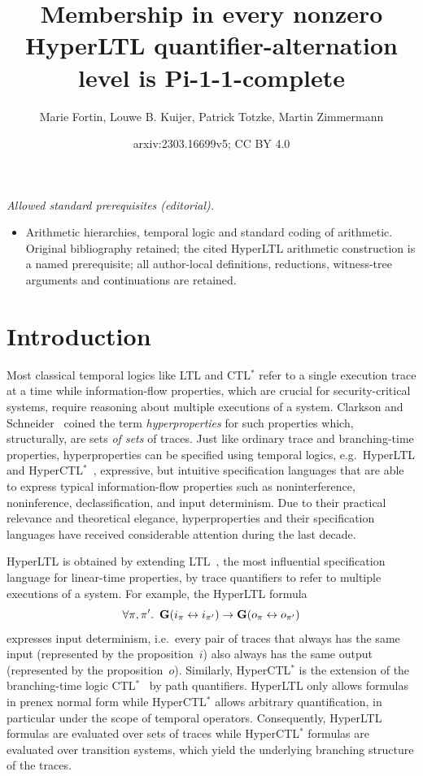 \documentclass[dvipsnames,10pt,a4paper]{amsart}
\title{Membership in every nonzero HyperLTL quantifier-alternation level is Pi-1-1-complete}
\author{Marie Fortin, Louwe B. Kuijer, Patrick Totzke, Martin Zimmermann}
\date{arxiv:2303.16699v5; CC BY 4.0}
\theoremstyle{definition}
\theoremstyle{remark}
\newcommand{\G}{\mathop{\mathbf{G}\vphantom{a}}\nolimits}
\newcommand{\ltl}{{LTL}\xspace}
\newcommand{\ctlstar}{{CTL$^*$}\xspace}
\newcommand{\hyltl}{{HyperLTL}\xspace}
\newcommand{\hyctlstar}{{HyperCTL$^*$}\xspace}
\begin{document}
\maketitle
\noindent\textit{Allowed standard prerequisites (editorial).}\begin{itemize}
\item Arithmetic hierarchies, temporal logic and standard coding of arithmetic. Original bibliography retained; the cited HyperLTL arithmetic construction is a named prerequisite; all author-local definitions, reductions, witness-tree arguments and continuations are retained.
\end{itemize}\medskip
\section{Introduction}
\label{sec:intro}

Most classical temporal logics like \ltl and \ctlstar refer to a single execution trace at a time while information-flow properties, which are crucial for security-critical systems,
require reasoning about multiple executions of a system. 
Clarkson and Schneider~\cite{ClarksonS10} coined the term \emph{hyperproperties} for such properties which, structurally, are sets \emph{of sets} of traces.
Just like ordinary trace and branching-time properties, hyperproperties can be specified using temporal logics, e.g.\ \hyltl and \hyctlstar~\cite{ClarksonFKMRS14}, expressive, but intuitive specification languages that are able to express typical information-flow properties such as noninterference, noninference, declassification, and input determinism.
Due to their practical relevance and theoretical elegance, hyperproperties and their specification languages have received considerable attention during the last decade.

\hyltl is obtained by extending \ltl~\cite{Pnueli77}, the most influential specification language for linear-time properties, by trace quantifiers to refer to multiple executions of a system. 
For example, the \hyltl formula
\[\forall \pi, \pi'.\ \G( i_\pi \leftrightarrow i_{\pi'}) \rightarrow \G (o_\pi \leftrightarrow o_{\pi'}) \]
expresses input determinism, i.e.\ every pair of traces that always has the same input (represented by the proposition~$i$) also always has the same output (represented by the proposition~$o$). 
Similarly, \hyctlstar is the extension of the branching-time logic \ctlstar~\cite{EmersonH86} by path quantifiers. 
\hyltl only allows formulas in prenex normal form while \hyctlstar allows arbitrary quantification, in particular under the scope of temporal operators. 
Consequently, \hyltl formulas are evaluated over sets of traces while \hyctlstar formulas are evaluated over transition systems, which yield the underlying branching structure of the traces. 
\end{document}
